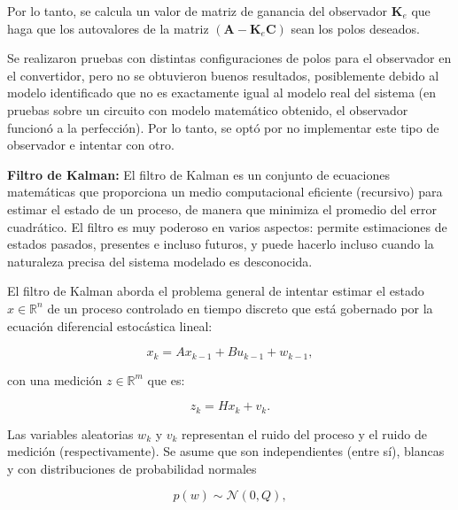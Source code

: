 Por lo tanto, se calcula un valor de matriz de ganancia del observador $\mathbf{K}_e$ que haga que los autovalores de la matriz $(\mathbf{A} - \mathbf{K}_e \mathbf{C})$
sean los polos deseados.

Se realizaron pruebas con distintas configuraciones de polos para el observador en el convertidor, pero no se obtuvieron buenos resultados,
posiblemente debido al modelo identificado que no es exactamente igual al modelo real del sistema (en pruebas sobre un circuito con modelo
matemático obtenido, el observador funcionó a la perfección). Por lo tanto, se optó por no implementar este tipo de observador e intentar con otro.

\textbf{Filtro de Kalman:} El filtro de Kalman es un conjunto de ecuaciones matemáticas que proporciona un medio computacional eficiente (recursivo)
para estimar el estado de un proceso, de manera que minimiza el promedio del error cuadrático. El filtro es muy poderoso en varios aspectos:
permite estimaciones de estados pasados, presentes e incluso futuros, y puede hacerlo incluso cuando la naturaleza precisa del sistema 
modelado es desconocida.

El filtro de Kalman aborda el problema general de intentar estimar el estado \( x \in \mathbb{R}^n \) de un proceso controlado en tiempo discreto
que está gobernado por la ecuación diferencial estocástica lineal:

\vspace{-0.5cm}
\begin{equation}
    x_k = A x_{k-1} + B u_{k-1} + w_{k-1},
\end{equation}
\vspace{-0.5cm}

con una medición \( z \in \mathbb{R}^m \) que es:

\vspace{-0.5cm}
\begin{equation}
    z_k = H x_k + v_k.
\end{equation}
\vspace{-0.5cm}

Las variables aleatorias \( w_k \) y \( v_k \) representan el ruido del proceso y el ruido de medición (respectivamente). Se asume que son
independientes (entre sí), blancas y con distribuciones de probabilidad normales

\vspace{-0.5cm}
\begin{equation}
    p(w) \sim \mathcal{N}(0, Q),
\end{equation}
\vspace{-0.5cm}

